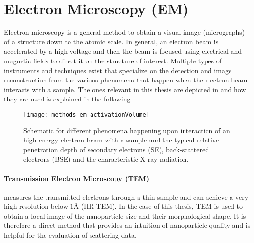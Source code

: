 \documentclass[\main/dresen_thesis.tex]{subfiles}
\begin{document}
  \section{Electron Microscopy (EM)}
    \label{ch:methods:em}
    Electron microscopy is a general method to obtain a visual image (micrographs) of a structure down to the atomic scale.
    In general, an electron beam is accelerated by a high voltage and then the beam is focused using electrical and magnetic fields to direct it on the structure of interest.
    Multiple types of instruments and techniques exist that specialize on the detection and image reconstruction from the various phenomena that happen when the electron beam interacts with a sample.
    The ones relevant in this thesis are depicted in  and how they are used is explained in the following.

    \begin{figure}[tb]
      \centering
      \texttt{[image: methods\_em\_activationVolume]}
      \caption{\label{fig:methods:em:activationVolume}Schematic for different phenomena happening upon interaction of an high-energy electron beam with a sample and the typical relative penetration depth of secondary electrons (SE), back-scattered electrons (BSE) and the characteristic X-ray radiation.}
    \end{figure}

    \paragraph{Transmission Electron Microscopy (TEM)}
      measures the transmitted electrons through a thin sample and can achieve a very high resolution below $1 \unit{\angstrom}$ (HR-TEM).
      In the case of this thesis, TEM is used to obtain a local image of the nanoparticle size and their morphological shape.
      It is therefore a direct method that provides an intuition of nanoparticle quality and is helpful for the evaluation of scattering data.
\end{document}
